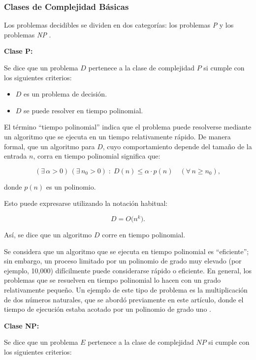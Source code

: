 \documentclass[12pt,titlepage,twoside,openright]{book}
\begin{document}
\subsubsection{Clases de Complejidad Básicas}

Los problemas decidibles se dividen en dos categorías: los problemas \emph{P} y los problemas \emph{NP} \citep{maldonado2013problema}.

\textbf{Clase P:}

Se dice que un problema \(D\) pertenece a la clase de complejidad \(P\) si cumple con los siguientes criterios:

\begin{itemize}
	\item \(D\) es un problema de decisión.
	\item \(D\) se puede resolver en tiempo polinomial.
\end{itemize}

El término “tiempo polinomial” indica que el problema puede resolverse mediante un algoritmo que se ejecuta en un tiempo relativamente rápido. De manera formal, que un algoritmo para \(D\), cuyo comportamiento depende del tamaño de la entrada \(n\), corra en tiempo polinomial significa que:

\[
	(\exists\,\alpha > 0)\,(\exists\,n_0 > 0)\;:\; D(n) \leq \alpha \cdot p(n) \quad (\forall\,n \geq n_0),
\]

donde \(p(n)\) es un polinomio.

Esto puede expresarse utilizando la notación habitual:

\[
	D = O\bigl(n^k\bigr).
\]

Así, se dice que un algoritmo \(D\) corre en tiempo polinomial.

Se considera que un algoritmo que se ejecuta en tiempo polinomial es “eficiente”; sin embargo, un proceso limitado por un polinomio de grado muy elevado (por ejemplo, 10,000) difícilmente puede considerarse rápido o eficiente. En general, los problemas que se resuelven en tiempo polinomial lo hacen con un grado relativamente pequeño. Un ejemplo de este tipo de problema es la multiplicación de dos números naturales, que se abordó previamente en este artículo, donde el tiempo de ejecución estaba acotado por un polinomio de grado uno \citep{Flores2014}.

\textbf{Clase NP:}

Se dice que un problema \(E\) pertenece a la clase de complejidad \(NP\) si cumple con los siguientes criterios:
\end{document}
